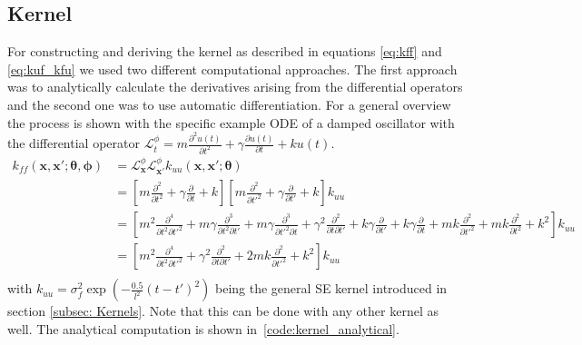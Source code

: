 \documentclass{article}
\begin{document}
\subsection{Kernel}
For constructing and deriving the kernel as described in equations \ref{eq:kff} and \ref{eq:kuf_kfu} we used two different computational approaches. The first approach was to analytically calculate the derivatives arising from the differential operators and the second one was to use automatic differentiation. For a general overview the process is shown with the specific example ODE of a damped oscillator with the differential operator $\mathcal{L}_{t}^\phi = m\frac{\partial^2 u(t)}{\partial t^2} + \gamma \frac{\partial u(t)}{\partial t} + k u(t) $.\\

\begin{equation}
\begin{aligned}
    k_{ff}(\bm{x},\bm{x'};\bm{\theta}, \bm{\phi}) &= \mathcal{L}_{\bm{x}}^\phi \mathcal{L}_{\bm{x'}}^\phi k_{uu}(\bm{x},\bm{x'};\bm{\theta})\\
    &= \left[ m\frac{\partial^2 }{\partial t^2} + \gamma \frac{\partial }{\partial t} + k \right] \left[ m\frac{\partial^2 }{\partial t'^2} + \gamma \frac{\partial }{\partial t'} + k \right] k_{uu} \\
    &= \left[m^2 \frac{\partial^4 }{\partial t^2 \partial t'^2} + m\gamma \frac{\partial^3 }{\partial t^2 \partial t'} + m\gamma \frac{\partial^3 }{\partial t'^2 \partial t} + \gamma^2 \frac{\partial^2 }{\partial t \partial t'} + k\gamma \frac{\partial }{\partial t'} + k\gamma \frac{\partial }{\partial t} +mk \frac{\partial^2 }{\partial t'^2} +mk \frac{\partial^2 }{\partial t^2} + k^2 \right] k_{uu}\\
    &= \left[m^2 \frac{\partial^4 }{\partial t^2 \partial t'^2}  + \gamma^2 \frac{\partial^2 }{\partial t \partial t'}  +2mk \frac{\partial^2 }{\partial t'^2} + k^2 \right] k_{uu}\\
\end{aligned}
\label{eq:kernel_analytical}
\end{equation}
 with $k_{uu} = \sigma_f^2  \exp\left({-\frac{0.5}{l^2} {(t-t')}^2}\right)$ being the general SE kernel introduced in section \ref{subsec: Kernels}. Note that this can be done with any other kernel as well. The analytical computation is shown in~\ref{code:kernel_analytical}.\\

\end{document}
